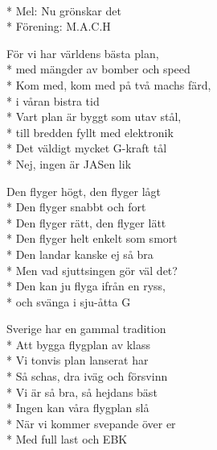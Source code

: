 \begin{SongText}
    \begin{SongInfo}
        \\*%
        Mel: Nu grönskar det\\*%
        Förening: M.A.C.H
    \end{SongInfo}
    \begin{Verse}
        För vi har världens bästa plan,\\*%
        med mängder av bomber och speed\\*%
        Kom med, kom med på två machs färd,\\*%
        i våran bistra tid\\*%
        Vart plan är byggt som utav stål,\\*%
        till bredden fyllt med elektronik\\*%
        Det väldigt mycket G-kraft tål\\*%
        Nej, ingen är JASen lik
    \end{Verse}
    \begin{Verse}
        Den flyger högt, den flyger lågt\\*%
        Den flyger snabbt och fort\\*%
        Den flyger rätt, den flyger lätt\\*%
        Den flyger helt enkelt som smort\\*%
        Den landar kanske ej så bra\\*%
        Men vad sjuttsingen gör väl det?\\*%
        Den kan ju flyga ifrån en ryss,\\*%
        och svänga i sju-åtta G
    \end{Verse}
    \begin{Verse}
        Sverige har en gammal tradition\\*%
        Att bygga flygplan av klass\\*%
        Vi tonvis plan lanserat har\\*%
        Så schas, dra iväg och försvinn\\*%
        Vi är så bra, så hejdans bäst\\*%
        Ingen kan våra flygplan slå\\*%
        När vi kommer svepande över er\\*%
        Med full last och EBK
    \end{Verse}
\end{SongText}


